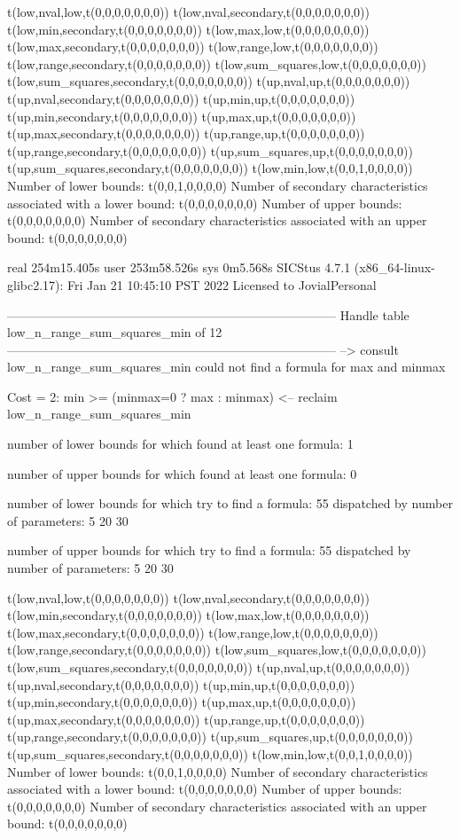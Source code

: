 t(low,nval,low,t(0,0,0,0,0,0,0))
t(low,nval,secondary,t(0,0,0,0,0,0,0))
t(low,min,secondary,t(0,0,0,0,0,0,0))
t(low,max,low,t(0,0,0,0,0,0,0))
t(low,max,secondary,t(0,0,0,0,0,0,0))
t(low,range,low,t(0,0,0,0,0,0,0))
t(low,range,secondary,t(0,0,0,0,0,0,0))
t(low,sum_squares,low,t(0,0,0,0,0,0,0))
t(low,sum_squares,secondary,t(0,0,0,0,0,0,0))
t(up,nval,up,t(0,0,0,0,0,0,0))
t(up,nval,secondary,t(0,0,0,0,0,0,0))
t(up,min,up,t(0,0,0,0,0,0,0))
t(up,min,secondary,t(0,0,0,0,0,0,0))
t(up,max,up,t(0,0,0,0,0,0,0))
t(up,max,secondary,t(0,0,0,0,0,0,0))
t(up,range,up,t(0,0,0,0,0,0,0))
t(up,range,secondary,t(0,0,0,0,0,0,0))
t(up,sum_squares,up,t(0,0,0,0,0,0,0))
t(up,sum_squares,secondary,t(0,0,0,0,0,0,0))
t(low,min,low,t(0,0,1,0,0,0,0))
Number of lower bounds:                                             t(0,0,1,0,0,0,0)
Number of secondary characteristics associated with a lower bound:  t(0,0,0,0,0,0,0)
Number of upper bounds:                                             t(0,0,0,0,0,0,0)
Number of secondary characteristics associated with an upper bound: t(0,0,0,0,0,0,0)

real	254m15.405s
user	253m58.526s
sys	0m5.568s
SICStus 4.7.1 (x86_64-linux-glibc2.17): Fri Jan 21 10:45:10 PST 2022
Licensed to JovialPersonal


--------------------------------------------------------------------------------
Handle table low_n_range_sum_squares_min of 12
--------------------------------------------------------------------------------
--> consult low_n_range_sum_squares_min
could not find a formula for max and minmax

Cost =  2:  min >= (minmax=0 ? max : minmax)
<-- reclaim low_n_range_sum_squares_min

number of lower bounds for which found at least one formula: 1

number of upper bounds for which found at least one formula: 0

number of lower bounds for which try to find a formula: 55
dispatched by number of parameters: 5  20  30

number of upper bounds for which try to find a formula: 55
dispatched by number of parameters: 5  20  30

t(low,nval,low,t(0,0,0,0,0,0,0))
t(low,nval,secondary,t(0,0,0,0,0,0,0))
t(low,min,secondary,t(0,0,0,0,0,0,0))
t(low,max,low,t(0,0,0,0,0,0,0))
t(low,max,secondary,t(0,0,0,0,0,0,0))
t(low,range,low,t(0,0,0,0,0,0,0))
t(low,range,secondary,t(0,0,0,0,0,0,0))
t(low,sum_squares,low,t(0,0,0,0,0,0,0))
t(low,sum_squares,secondary,t(0,0,0,0,0,0,0))
t(up,nval,up,t(0,0,0,0,0,0,0))
t(up,nval,secondary,t(0,0,0,0,0,0,0))
t(up,min,up,t(0,0,0,0,0,0,0))
t(up,min,secondary,t(0,0,0,0,0,0,0))
t(up,max,up,t(0,0,0,0,0,0,0))
t(up,max,secondary,t(0,0,0,0,0,0,0))
t(up,range,up,t(0,0,0,0,0,0,0))
t(up,range,secondary,t(0,0,0,0,0,0,0))
t(up,sum_squares,up,t(0,0,0,0,0,0,0))
t(up,sum_squares,secondary,t(0,0,0,0,0,0,0))
t(low,min,low,t(0,0,1,0,0,0,0))
Number of lower bounds:                                             t(0,0,1,0,0,0,0)
Number of secondary characteristics associated with a lower bound:  t(0,0,0,0,0,0,0)
Number of upper bounds:                                             t(0,0,0,0,0,0,0)
Number of secondary characteristics associated with an upper bound: t(0,0,0,0,0,0,0)

